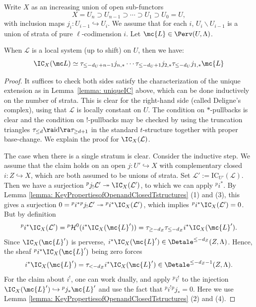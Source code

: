 \documentclass[letterpaper,11pt]{amsart}
\begin{document}
Write $X$ as an increasing union of open sub-functors
\[X=U_n\supset U_{n-1}\supset \cdots \supset U_1\supset U_0 = U,\]
with inclusion maps $j_i: U_{i-1}\hookrightarrow U_i$. We assume that for each $i$, $U_i\backslash U_{i-1}$ is a union of strata of pure $\ell$-codimension $i$. Let $\mc{L} \in \Perv(U,\Lambda)$. 
\begin{corollary}\label{cor: DeligneFormula}
When $\mathcal{L}$ is a local system (up to shift) on $U$, then we have:
\[\IC_X(\mc L)\simeq \tau_{\leq -d_U+n-1}j_{n,\ast}\cdots \tau_{\leq -d_U+1} j_{2,\ast}\tau_{\leq -d_U} j_{1,\ast}\mc{L}\]
\end{corollary}
\begin{proof}
    It suffices to check both sides satisfy the characterization of the unique extension as in Lemma~\ref{lemma: uniqueIC} above, which can be done inductively on the number of strata. This is clear for the right-hand side (called Deligne's complex), using that $\mathcal{L}$ is locally constant on $U$. The condition on $\ast$-pullbacks is clear and the condition on $!$-pullbacks may be checked by using the truncation triangles $\tau_{\leq d} \ra \mathrm{id} \ra \tau_{\geq d + 1}$ in the standard $t$-structure together with proper base-change. We explain the proof for $\IC_{X}(\mathcal{L})$.
    
    The case when there is a single stratum is clear. 
    Consider the inductive step. We assume that the claim holds on an open $j: U' \hookrightarrow X$ with complementary closed $i:Z\hookrightarrow X$, which are both assumed to be unions of strata. Set $\mathcal{L}':=\mathrm{IC}_{U'}(\mathcal{L})$. Then we have a surjection $\phantom{}^pj_{!}\mathcal{L}' \twoheadrightarrow \IC_X(\mathcal{L}')$, to which we can apply $\phantom{}^pi^\ast$. By Lemma \ref{lemma: KeyPropertiesofOpenandClosedTstructures} (1) and (3), this gives a surjection $0=\phantom{}^pi^\ast\phantom{}^pj_{!}\mathcal{L}' \twoheadrightarrow \phantom{}^pi^\ast\IC_X(\mathcal{L}')$, which implies $\phantom{}^pi^\ast\IC_{X}(\mathcal{L}') =0$. But by definition 
    \[\phantom{}^pi^\ast\IC_{X}(\mathcal{L}') = \phantom{}^p\mathcal{H}^0(i^\ast\IC_X(\mc{L}'))=\tau_{\geq -d_Z}\tau_{\leq -d_Z}i^\ast\IC_X(\mc{L}'). \]
    Since $\IC_X(\mc{L}')$ is perverse,  $i^\ast\IC_X(\mc{L}') \in \Detale^{\leq -d_Z}(Z,\Lambda)$. Hence, the sheaf $\phantom{}^pi^\ast\IC_{X}(\mc{L}')$ being zero forces 
    \[i^\ast\IC_X(\mc{L}') =\tau_{< -d_Z}i^\ast\IC_X(\mc{L}') \in  \Detale^{\leq -d_Z-1}(Z,\Lambda).\]
    For the claim about $i^!$, one can work dually, and apply $\phantom{}^pi^!$ to the injection $\IC_X(\mc{L}') \hookrightarrow \phantom{}^pj_{\ast}\mc{L}'$ and use the fact that $\phantom{}^pi^! \phantom{}^pj_\ast=0$. Here we use Lemma \ref{lemma: KeyPropertiesofOpenandClosedTstructures} (2) and (4).
\end{proof}
\end{document}
